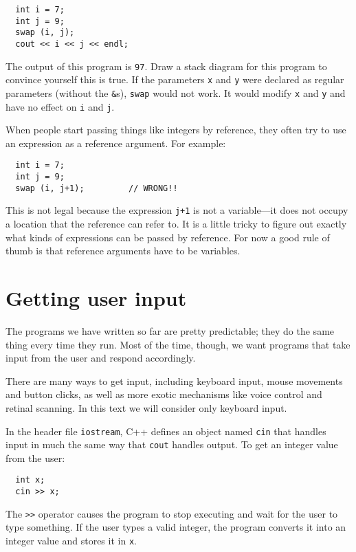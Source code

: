 \begin{verbatim}
  int i = 7;
  int j = 9;
  swap (i, j);
  cout << i << j << endl;
\end{verbatim}
%
The output of this program is {\tt 97}.  Draw a stack
diagram for this program to convince yourself this is true.
If the parameters {\tt x} and {\tt y} were declared as
regular parameters (without the {\tt \&}s), {\tt swap} would
not work.  It would modify {\tt x} and {\tt y} and have no
effect on {\tt i} and {\tt j}.

When people start passing things like integers by reference,
they often try to use an expression
as a reference argument.  For example:

\begin{verbatim}
  int i = 7;
  int j = 9;
  swap (i, j+1);         // WRONG!!
\end{verbatim}
%
This is not legal because the expression {\tt j+1} is not
a variable---it does not occupy a location that the reference
can refer to.  It is a little tricky to figure out exactly
what kinds of expressions can be passed by reference.  For now
a good rule of thumb is that reference arguments have to be
variables.

\section{Getting user input}
\label{input}

The programs we have written so far are pretty predictable;
they do the same thing every time they run.  Most of the time,
though, we want programs that take input from the user and
respond accordingly.

There are many ways to get input, including keyboard
input, mouse movements and button clicks, as well as more exotic
mechanisms like voice control and retinal scanning.  In this
text we will consider only keyboard input.


In the header file {\tt iostream},
C++ defines an object named {\tt cin} that handles input in
much the same way that {\tt cout} handles output.  To get an
integer value from the user:

\begin{verbatim}
  int x;
  cin >> x;
\end{verbatim}
%
The {\tt >>} operator causes the program to stop executing and
wait for the user to type something.  If the user types a valid
integer, the program converts it into an integer value and
stores it in {\tt x}.


